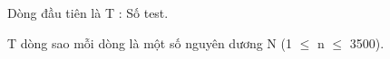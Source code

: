 Dòng đầu tiên là T : Số test.

T dòng sao mỗi dòng là một số nguyên dương N (1 $\le$ n  $\le$ 3500).